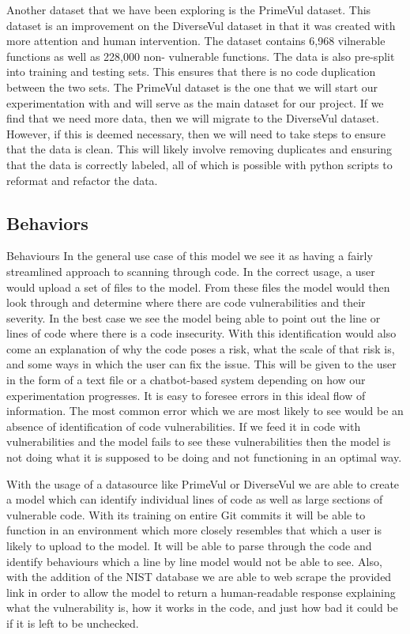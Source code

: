 \documentclass{article}
\begin{document}
Another dataset that we have been exploring is the PrimeVul \cite{ding2024vulnerabilitydetectioncodelanguage} dataset. This dataset is an 
improvement on the DiverseVul dataset in that it was created with more attention and human
intervention. The dataset contains 6,968 vilnerable functions as well as 228,000 non-
vulnerable functions. The data is also pre-split into training and testing sets. This ensures
that there is no code duplication between the two sets. The PrimeVul dataset is the one that
we will start our experimentation with and will serve as the main dataset for our project.
If we find that we need more data, then we will migrate to the DiverseVul dataset. However,
if this is deemed necessary, then we will need to take steps to ensure that the data is clean.
This will likely involve removing duplicates and ensuring that the data is correctly labeled,
all of which is possible with python scripts to reformat and refactor the data. 

\subsection{Behaviors}
Behaviours
In the general use case of this model we see it as having a fairly streamlined approach to scanning through code. In the correct usage, a user would upload a set of files to the model. From these files the model would then look through and determine where there are code vulnerabilities and their severity. In the best case we see the model being able to point out the line or lines of code where there is a code insecurity. With this identification would also come an explanation of why the code poses a risk, what the scale of that risk is, and some ways in which the user can fix the issue. This will be given to the user in the form of a text file or a chatbot-based system depending on how our experimentation progresses. 
It is easy to foresee errors in this ideal flow of information. The most common error which we are most likely to see would be an absence of identification of code vulnerabilities. If we feed it in code with vulnerabilities and the model fails to see these vulnerabilities then the model is not doing what it is supposed to be doing and not functioning in an optimal way. 

With the usage of a datasource like PrimeVul or DiverseVul we are able to create a model which can identify individual lines of code as well as large sections of vulnerable code. With its training on entire Git commits it will be able to function in an environment which more closely resembles that which a user is likely to upload to the model. It will be able to parse through the code and identify behaviours which a line by line model would not be able to see. Also, with the addition of the NIST database we are able to web scrape the provided link in order to allow the model to return a human-readable response explaining what the vulnerability is, how it works in the code, and just how bad it could be if it is left to be unchecked. 
\end{document}
